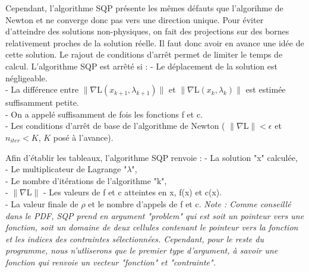 Cependant, l'algorithme SQP présente les mêmes défauts que l'algorihme de Newton et ne converge donc pas vers une direction unique. Pour éviter d'atteindre des solutions non-physiques, on fait des projections sur des bornes relativement proches de la solution réelle. Il faut donc avoir en avance une idée de cette solution.\bigbreak
\indent Le rajout de conditions d'arrêt permet de limiter le temps de calcul. L'algorithme SQP est arrêté si :\medbreak
- Le déplacement de la solution est négligeable.\\
\indent- La différence entre $\|    \nabla$L$(x_{k+1},\lambda_{k+1})   \| $ et $\|    \nabla $L$(x_{k},\lambda_{k})   \|$ est estimée suffisamment petite.\\
\indent- On a appelé suffisamment de fois les fonctions f et c.\\
\indent- Les conditions d'arrêt de base de l'algorithme de Newton ( $\| \nabla $L$ \| < \epsilon$ et $n_{iter} < K$, $K$ posé à l'avance).\\
\par
Afin d'établir les tableaux, l'algorithme SQP renvoie :\medbreak
\indent- La solution "x" calculée,\\
\indent- Le multiplicateur de Lagrange "$\lambda$",\\
\indent- Le nombre d'itérations de l'algorithme "k",\\
\indent- $\| \nabla$L$ \|$
\indent- Les valeurs de f et c atteintes en x, f(x) et c(x).\\
\indent- La valeur finale de $\rho$ et le nombre d'appels de f et c.
\bigbreak
\textit{Note : Comme conseillé dans le PDF, SQP prend en argument "problem" qui est soit un pointeur vers une fonction, soit un domaine de deux cellules contenant le pointeur vers la fonction et les indices des contraintes sélectionnées. Cependant, pour le reste du programme, nous n'utliserons que le premier type d'argument, à savoir une fonction qui renvoie un vecteur "fonction" et "contrainte".}
